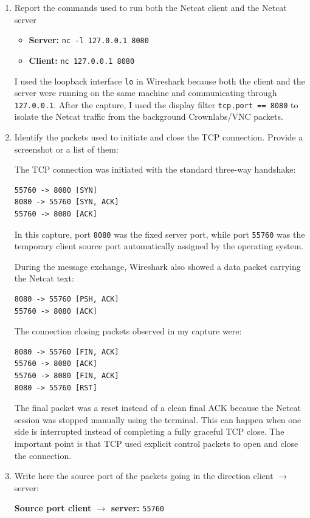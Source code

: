 \documentclass{article}
\begin{document}
\begin{enumerate}
    \item Report the commands used to run both the Netcat client and the Netcat server
    \begin{itemize}
        \item \textbf{Server:} \texttt{nc -l 127.0.0.1 8080}
        \item \textbf{Client:} \texttt{nc 127.0.0.1 8080}
    \end{itemize}

    I used the loopback interface \texttt{lo} in Wireshark because both the client and the server were running on the same machine and communicating through \texttt{127.0.0.1}. After the capture, I used the display filter \texttt{tcp.port == 8080} to isolate the Netcat traffic from the background Crownlabs/VNC packets.

    \item Identify the packets used to initiate and close the TCP connection. Provide a screenshot or a list of them:

    The TCP connection was initiated with the standard three-way handshake:
    \begin{verbatim}
55760 -> 8080 [SYN]
8080 -> 55760 [SYN, ACK]
55760 -> 8080 [ACK]
    \end{verbatim}

    In this capture, port \texttt{8080} was the fixed server port, while port \texttt{55760} was the temporary client source port automatically assigned by the operating system.

    During the message exchange, Wireshark also showed a data packet carrying the Netcat text:
    \begin{verbatim}
8080 -> 55760 [PSH, ACK]
55760 -> 8080 [ACK]
    \end{verbatim}

    The connection closing packets observed in my capture were:
    \begin{verbatim}
8080 -> 55760 [FIN, ACK]
55760 -> 8080 [ACK]
55760 -> 8080 [FIN, ACK]
8080 -> 55760 [RST]
    \end{verbatim}

    The final packet was a reset instead of a clean final ACK because the Netcat session was stopped manually using the terminal. This can happen when one side is interrupted instead of completing a fully graceful TCP close. The important point is that TCP used explicit control packets to open and close the connection.

    \item Write here the source port of the packets going in the direction client $\rightarrow$ server:

    \textbf{Source port client $\rightarrow$ server:} \texttt{55760}
\end{enumerate}
\end{document}
